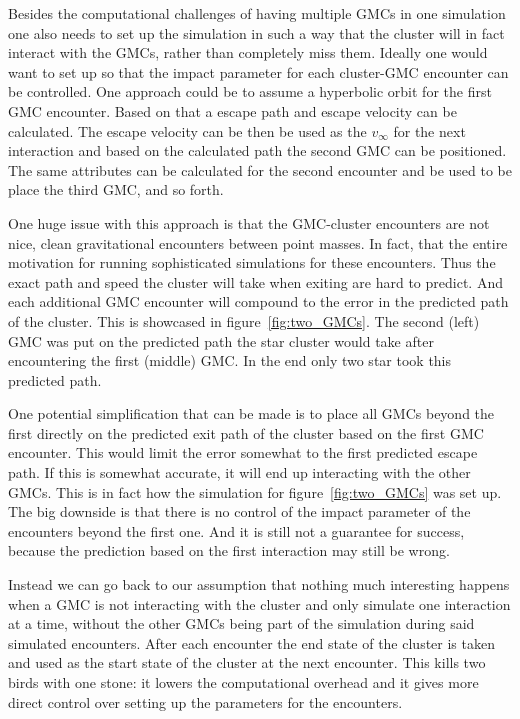 \documentclass{aa}
\begin{document}
Besides the computational challenges of having multiple GMCs in one simulation one also needs to set up the simulation in such a way that the cluster will in fact interact with the GMCs, rather than completely miss them. Ideally one would want to set up so that the impact parameter for each cluster-GMC encounter can be controlled. One approach could be to assume a hyperbolic orbit for the first GMC encounter. Based on that a escape path and escape velocity can be calculated. The escape velocity can be then be used as the $v_\infty$ for the next interaction and based on the calculated path the second GMC can be positioned. The same attributes can be calculated for the second encounter and be used to be place the third GMC, and so forth.

One huge issue with this approach is that the GMC-cluster encounters are not nice, clean gravitational encounters between point masses. In fact, that the entire motivation for running sophisticated simulations for these encounters. Thus the exact path and speed the cluster will take when exiting are hard to predict.  And each additional GMC encounter will compound to the error in the predicted path of the cluster. This is showcased in figure~\ref{fig:two_GMCs}. The second (left) GMC was put on the predicted path the star cluster would take after encountering the first (middle) GMC. In the end only two star took this predicted path.

One potential simplification that can be made is to place all GMCs beyond the first directly on the predicted exit path of the cluster based on the first GMC encounter. This would limit the error somewhat to the first predicted escape path. If this is somewhat accurate, it will end up interacting with the other GMCs. This is in fact how the simulation for figure~\ref{fig:two_GMCs} was set up. The big downside is that there is no control of the impact parameter of the encounters beyond the first one. And it is still not a guarantee for success, because the prediction based on the first interaction may still be wrong.

Instead we can go back to our assumption that nothing much interesting happens when a GMC is not interacting with the cluster and only simulate one interaction at a time, without the other GMCs being part of the simulation during said simulated encounters. After each encounter the end state of the cluster is taken and used as the start state of the cluster at the next encounter. This kills two birds with one stone: it lowers the computational overhead and it gives more direct control over setting up the parameters for the encounters.
\end{document}

